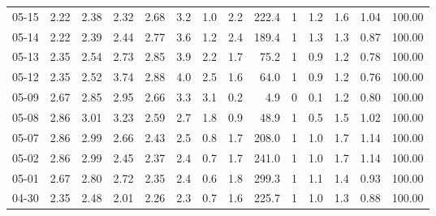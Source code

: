 \begin{threeparttable}
{\begin{tabular}{lrrrrrrrrrrrrr}
  05-15 &          2.22 &          2.38 &          2.32 &        2.68 &                 3.2 &                 1.0 &        2.2 &        222.4 &              1 &                 1.2 &              1.6 &            1.04 &                 100.00 \\
  05-14 &          2.22 &          2.39 &          2.44 &        2.77 &                 3.6 &                 1.2 &        2.4 &        189.4 &              1 &                 1.3 &              1.3 &            0.87 &                 100.00 \\
  05-13 &          2.35 &          2.54 &          2.73 &        2.85 &                 3.9 &                 2.2 &        1.7 &         75.2 &              1 &                 0.9 &              1.2 &            0.78 &                 100.00 \\
  05-12 &          2.35 &          2.52 &          3.74 &        2.88 &                 4.0 &                 2.5 &        1.6 &         64.0 &              1 &                 0.9 &              1.2 &            0.76 &                 100.00 \\
  05-09 &          2.67 &          2.85 &          2.95 &        2.66 &                 3.3 &                 3.1 &        0.2 &          4.9 &              0 &                 0.1 &              1.2 &            0.80 &                 100.00 \\
  05-08 &          2.86 &          3.01 &          3.23 &        2.59 &                 2.7 &                 1.8 &        0.9 &         48.9 &              1 &                 0.5 &              1.5 &            1.02 &                 100.00 \\
  05-07 &          2.86 &          2.99 &          2.66 &        2.43 &                 2.5 &                 0.8 &        1.7 &        208.0 &              1 &                 1.0 &              1.7 &            1.14 &                 100.00 \\
  05-02 &          2.86 &          2.99 &          2.45 &        2.37 &                 2.4 &                 0.7 &        1.7 &        241.0 &              1 &                 1.0 &              1.7 &            1.14 &                 100.00 \\
  05-01 &          2.67 &          2.80 &          2.72 &        2.35 &                 2.4 &                 0.6 &        1.8 &        299.3 &              1 &                 1.1 &              1.4 &            0.93 &                 100.00 \\
  04-30 &          2.35 &          2.48 &          2.01 &        2.26 &                 2.3 &                 0.7 &        1.6 &        225.7 &              1 &                 1.0 &              1.3 &            0.88 &                 100.00 \\

\end{tabular}}
\end{threeparttable}
